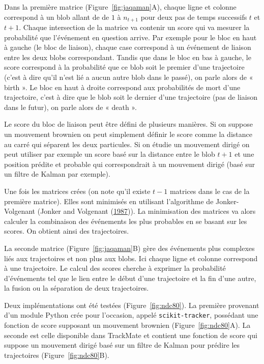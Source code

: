 \documentclass[12pt,a4paper,twoside,openright]{book}
\begin{document}
Dans la première matrice (Figure~\ref{fig:jaqaman}A), chaque ligne et
colonne correspond à un blob allant de de \(1\) à \(n_{t+1}\) pour deux
pas de temps successifs \(t\) et \(t+1\). Chaque intersection de la
matrice va contenir un score qui va mesurer la probabilité que
l'événement en question arrive. Par exemple pour le bloc en haut à
gauche (le bloc de liaison), chaque case correspond à un événement de
liaison entre les deux blobs correspondant. Tandis que dans le bloc en
bas à gauche, le score correspond à la probabilité que ce blob soit le
premier d'une trajectoire (c'est à dire qu'il n'est lié a aucun autre
blob dans le passé), on parle alors de « birth ». Le bloc en haut à
droite correspond aux probabilités de mort d'une trajectoire, c'est à
dire que le blob soit le dernier d'une trajectoire (pas de liaison dans
le futur), on parle alors de « death ».

Le score du bloc de liaison peut être défini de plusieurs manières. Si
on suppose un mouvement brownien on peut simplement définir le score
comme la distance au carré qui séparent les deux particules. Si on
étudie un mouvement dirigé on peut utiliser par exemple un score basé
sur la distance entre le blob \(t+1\) et une position prédite et
probable qui correspondrait à un mouvement dirigé (basé sur un filtre de
Kalman par exemple).

Une fois les matrices crées (on note qu'il existe \(t-1\) matrices dans
le cas de la première matrice). Elles sont minimisés en utilisant
l'algorithme de Jonker-Volgenant (Jonker and Volgenant
(\hyperref[ref-Jonker1987]{1987})). La minimisation des matrices va
alors calculer la combinaison des événements les plus probables en se
basant sur les scores. On obtient ainsi des trajectoires.

La seconde matrice (Figure~\ref{fig:jaqaman}B) gère des événements plus
complexes liés aux trajectoires et non plus aux blobs. Ici chaque ligne
et colonne correspond à une trajectoire. Le calcul des scores cherche à
exprimer la probabilité d'événements tel que le lien entre le début
d'une trajectoire et la fin d'une autre, la fusion ou la séparation de
deux trajectoires.

Deux implémentations ont été testées (Figure~\ref{fig:ndc80}). La
première provenant d'un module Python crée pour l'occasion, appelé
\texttt{scikit-tracker}, possédant une fonction de score supposant un
mouvement brownien (Figure~\ref{fig:ndc80}A). La seconde est celle
disponible dans TrackMate et contient une fonction de score qui suppose
un mouvement dirigé basé sur un filtre de Kalman pour prédire les
trajectoires (Figure~\ref{fig:ndc80}B).
\end{document}
